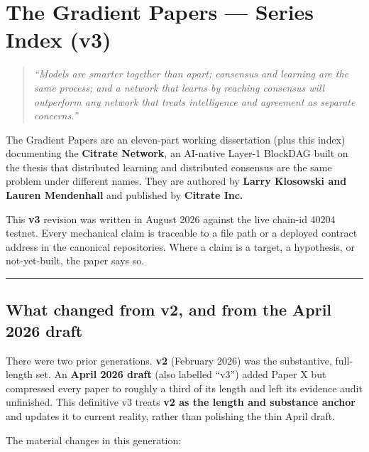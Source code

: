 \section{The Gradient Papers --- Series Index
(v3)}\label{the-gradient-papers-series-index-v3}

\begin{quote}
\emph{``Models are smarter together than apart; consensus and learning
are the same process; and a network that learns by reaching consensus
will outperform any network that treats intelligence and agreement as
separate concerns.''}
\end{quote}

The Gradient Papers are an eleven-part working dissertation (plus this
index) documenting the \textbf{Citrate Network}, an AI-native Layer-1
BlockDAG built on the thesis that distributed learning and distributed
consensus are the same problem under different names. They are authored
by \textbf{Larry Klosowski and Lauren Mendenhall} and published by
\textbf{Citrate Inc.}

This \textbf{v3} revision was written in August 2026 against the live
chain-id 40204 testnet. Every mechanical claim is traceable to a file
path or a deployed contract address in the canonical repositories. Where
a claim is a target, a hypothesis, or not-yet-built, the paper says so.

\begin{center}\rule{0.5\linewidth}{0.5pt}\end{center}

\subsection{What changed from v2, and from the April 2026
draft}\label{what-changed-from-v2-and-from-the-april-2026-draft}

There were two prior generations. \textbf{v2} (February 2026) was the
substantive, full-length set. An \textbf{April 2026 draft} (also
labelled ``v3'') added Paper X but compressed every paper to roughly a
third of its length and left its evidence audit unfinished. This
definitive v3 treats \textbf{v2 as the length and substance anchor} and
updates it to current reality, rather than polishing the thin April
draft.

The material changes in this generation:


